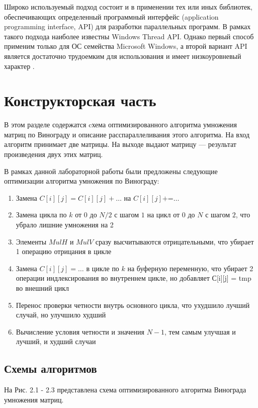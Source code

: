 \documentclass[12pt]{report}
\begin{document}
Широко используемый подход состоит и в применении тех или иных библиотек, обеспечивающих определенный программный интерфейс (application programming interface, API) для разработки параллельных программ. В рамках такого подхода наиболее известны Windows Thread API. Однако первый способ применим только для ОС семейства Microsoft Windows, а второй вариант API является достаточно трудоемким для использования и имеет низкоуровневый характер \cite{Barkalov}.


\chapter{Конструкторская часть}
В этом разделе содержатся cхема оптимизированного алгоритма умножения матриц по Винограду и описание расспараллеливания этого алгоритма.
На вход алгоритм принимает две матрицы. На выходе выдают матрицу — результат произведения двух этих матриц.\vspace{\baselineskip}

В рамках данной лабораторной работы были предложены следующие оптимизации алгоритма умножения по Винограду:
\begin{enumerate}
	\item Замена $C[i][j] = C[i][j] + \ldots$ на $C[i][j] \text{+=} \ldots$
	\item Замена цикла по $k$ от $0$ до $N/2$ с шагом $1$ на цикл от $0$ до $N$ с шагом $2$, что убрало лишние умножения на 2
	\item Элементы $MulH$ и $MulV$ сразу высчитываются отрицательными, что убирает 1 операцию отрицания в цикле
	\item Замена $C[i][j] = \ldots$ в цикле по $k$ на буферную переменную, что убирает 2 операции индлексирования во внутреннем цикле, но добавляет С[i][j] = tmp во внешний цикл
	\item Перенос проверки четности внутрь основного цикла, что ухудшило лучший случай, но улучшило худший
	\item Вычисление условия четности и значения $N-1$, тем самым улучшая и лучший, и худший случаи
\end{enumerate}
	
\section{Схемы алгоритмов}
На Рис. 2.1 - 2.3 представлена схема оптимизированного алгоритма Винограда умножения матриц.
\end{document}
